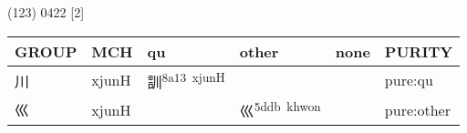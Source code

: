 \documentclass[14pt,a4paper]{scrartcl}
\begin{document}
(123) 0422 {[}2{]}

\begin{longtable}[c]{@{}llllll@{}}
\toprule
\begin{minipage}[b]{0.14\columnwidth}\raggedright\strut
GROUP
\strut\end{minipage} &
\begin{minipage}[b]{0.14\columnwidth}\raggedright\strut
MCH
\strut\end{minipage} &
\begin{minipage}[b]{0.14\columnwidth}\raggedright\strut
qu
\strut\end{minipage} &
\begin{minipage}[b]{0.14\columnwidth}\raggedright\strut
other
\strut\end{minipage} &
\begin{minipage}[b]{0.14\columnwidth}\raggedright\strut
none
\strut\end{minipage} &
\begin{minipage}[b]{0.14\columnwidth}\raggedright\strut
PURITY
\strut\end{minipage}\tabularnewline
\midrule
\endhead
\begin{minipage}[t]{0.14\columnwidth}\raggedright\strut
川
\strut\end{minipage} &
\begin{minipage}[t]{0.14\columnwidth}\raggedright\strut
xjunH
\strut\end{minipage} &
\begin{minipage}[t]{0.14\columnwidth}\raggedright\strut
訓\textsuperscript{8a13~xjunH}
\strut\end{minipage} &
\begin{minipage}[t]{0.14\columnwidth}\raggedright\strut
\strut\end{minipage} &
\begin{minipage}[t]{0.14\columnwidth}\raggedright\strut
\strut\end{minipage} &
\begin{minipage}[t]{0.14\columnwidth}\raggedright\strut
pure:qu
\strut\end{minipage}\tabularnewline
\begin{minipage}[t]{0.14\columnwidth}\raggedright\strut
巛
\strut\end{minipage} &
\begin{minipage}[t]{0.14\columnwidth}\raggedright\strut
xjunH
\strut\end{minipage} &
\begin{minipage}[t]{0.14\columnwidth}\raggedright\strut
\strut\end{minipage} &
\begin{minipage}[t]{0.14\columnwidth}\raggedright\strut
巛\textsuperscript{5ddb~khwon}
\strut\end{minipage} &
\begin{minipage}[t]{0.14\columnwidth}\raggedright\strut
\strut\end{minipage} &
\begin{minipage}[t]{0.14\columnwidth}\raggedright\strut
pure:other
\strut\end{minipage}\tabularnewline
\bottomrule
\end{longtable}
\end{document}
